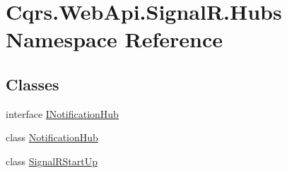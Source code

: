\hypertarget{namespaceCqrs_1_1WebApi_1_1SignalR_1_1Hubs}{}\section{Cqrs.\+Web\+Api.\+Signal\+R.\+Hubs Namespace Reference}
\label{namespaceCqrs_1_1WebApi_1_1SignalR_1_1Hubs}
\subsection*{Classes}
\begin{DoxyCompactItemize}
\item 
interface \hyperlink{interfaceCqrs_1_1WebApi_1_1SignalR_1_1Hubs_1_1INotificationHub}{I\+Notification\+Hub}
\item 
class \hyperlink{classCqrs_1_1WebApi_1_1SignalR_1_1Hubs_1_1NotificationHub}{Notification\+Hub}
\item 
class \hyperlink{classCqrs_1_1WebApi_1_1SignalR_1_1Hubs_1_1SignalRStartUp}{Signal\+R\+Start\+Up}
\end{DoxyCompactItemize}
